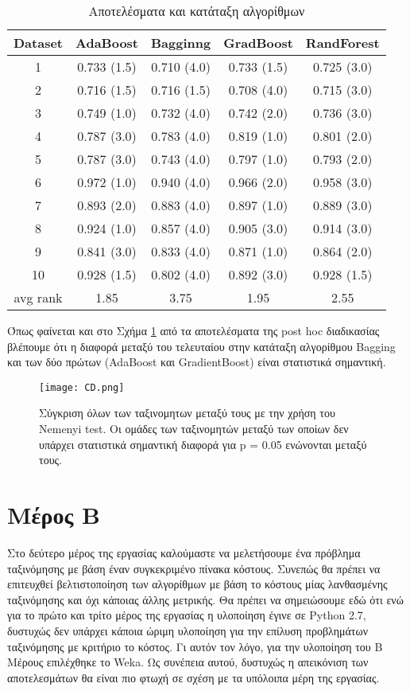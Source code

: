 \begin{table*}
	\centering
	\caption{Αποτελέσματα και κατάταξη αλγορίθμων}
	\label{tab:ranking}
	\begin{tabular}{ccccc}
		\hline
		\ttfamily Dataset & \ttfamily AdaBoost & \ttfamily Bagginng & \ttfamily GradBoost & \ttfamily RandForest
		\\	\hline
		1&	0.733 (1.5)&    0.710 (4.0) &	0.733 (1.5)&	0.725 (3.0) \\ \hline
		2&	0.716 (1.5)&    0.716 (1.5) &	0.708 (4.0)&	0.715 (3.0)\\ \hline
		3&	0.749 (1.0)&	0.732 (4.0)&	0.742 (2.0)&	0.736 (3.0) \\ \hline
		4&	0.787 (3.0)&	0.783 (4.0)&	0.819 (1.0)&	0.801 (2.0)\\ \hline
		5&	0.787 (3.0)&	0.743 (4.0)&	0.797 (1.0)&	0.793 (2.0)\\ \hline
		6&	0.972 (1.0)&	0.940 (4.0)&	0.966 (2.0)&	0.958 (3.0)\\ \hline
		7&	0.893 (2.0)&	0.883 (4.0)&	0.897 (1.0)&	0.889 (3.0)\\ \hline
		8&	0.924 (1.0)&	0.857 (4.0)&	0.905 (3.0)&	0.914 (3.0)\\ \hline
		9&	0.841 (3.0)&	0.833 (4.0)&	0.871 (1.0)&	0.864 (2.0)\\ \hline
		10&	0.928 (1.5)&	0.802 (4.0)&	0.892 (3.0)&	0.928 (1.5)\\ \hline
		avg rank&1.85 &	3.75 & 1.95 & 2.55
		\\ \hline
	\end{tabular}
\end{table*}

Όπως φαίνεται και στο Σχήμα \ref{fig:CD} από τα αποτελέσματα της post hoc διαδικασίας βλέπουμε ότι η διαφορά μεταξύ του τελευταίου στην κατάταξη αλγορίθμου Bagging και των δύο πρώτων (AdaBoost και GradientBoost) είναι στατιστικά σημαντική.

\begin{figure}
	\centering
	\texttt{[image: CD.png]} %
	\caption{Σύγκριση όλων των ταξινομητων μεταξύ τους με την χρήση του Nemenyi test. Οι ομάδες των ταξινομητών μεταξύ των οποίων δεν υπάρχει στατιστικά σημαντική διαφορά για p = 0.05 ενώνονται μεταξύ τους.}
	\label{fig:CD}
\end{figure}


\section{Μέρος Β}
Στο δεύτερο μέρος της εργασίας καλούμαστε να μελετήσουμε ένα πρόβλημα ταξινόμησης με βάση έναν συγκεκριμένο πίνακα κόστους. Συνεπώς θα πρέπει να επιτευχθεί βελτιστοποίηση των αλγορίθμων με βάση το κόστους μίας λανθασμένης ταξινόμησης και όχι κάποιας άλλης μετρικής. Θα πρέπει να σημειώσουμε εδώ ότι ενώ για το πρώτο και τρίτο μέρος της εργασίας η υλοποίηση έγινε σε Python 2.7,  δυστυχώς δεν υπάρχει κάποια ώριμη υλοποίηση για την επίλυση προβλημάτων ταξινόμησης με κριτήριο το κόστος. Γι αυτόν τον λόγο, για την υλοποίηση του Β Μέρους επιλέχθηκε το Weka. Ως συνέπεια αυτού, δυστυχώς η απεικόνιση των αποτελεσμάτων θα είναι πιο φτωχή σε σχέση με τα υπόλοιπα μέρη της εργασίας.


